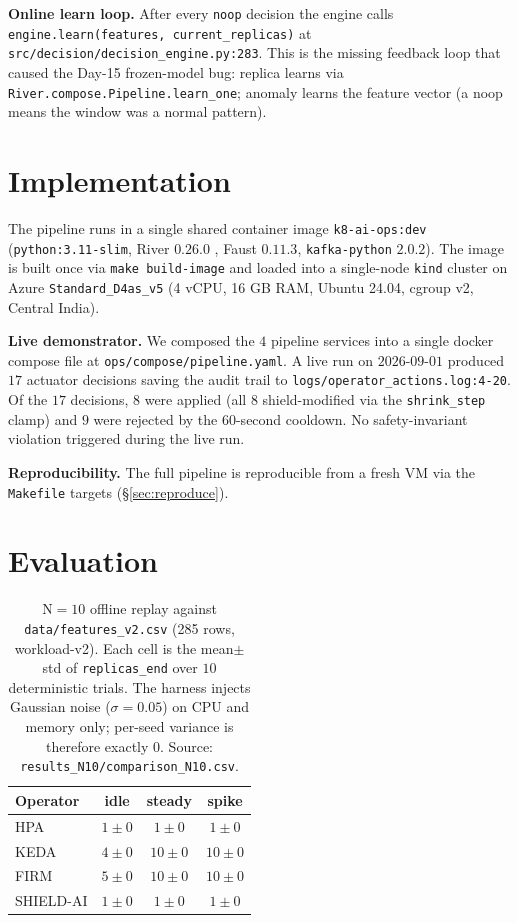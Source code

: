 \documentclass[conference,10pt]{IEEEtran}
\begin{document}
\textbf{Online learn loop.} After every \texttt{noop} decision the
engine calls \texttt{engine.learn(features, current\_replicas)} at
\texttt{src/decision/decision\_engine.py:283}. This is the missing
feedback loop that caused the Day-15 frozen-model bug:
replica learns via \texttt{River.compose.Pipeline.learn\_one};
anomaly learns the feature vector (a noop means the window was a
normal pattern).

\section{Implementation}
\label{sec:impl}

The pipeline runs in a single shared container image
\texttt{k8-ai-ops:dev} (\texttt{python:3.11-slim}, River $0.26.0$
\cite{river_jmlr_2020}, Faust $0.11.3$, \texttt{kafka-python} $2.0.2$).
The image is built once via \texttt{make build-image} and loaded into
a single-node \texttt{kind} cluster on Azure
\texttt{Standard\_D4as\_v5} (4 vCPU, 16 GB RAM, Ubuntu 24.04,
cgroup v2, Central India).

\textbf{Live demonstrator.} We composed the $4$ pipeline services
into a single docker compose file at \texttt{ops/compose/pipeline.yaml}.
A live run on $2026$-$09$-$01$ produced $17$ actuator decisions
saving the audit trail to \texttt{logs/operator\_actions.log:4-20}.
Of the $17$ decisions, $8$ were applied (all $8$ shield-modified via
the \texttt{shrink\_step} clamp) and $9$ were rejected by the
$60$-second cooldown. No safety-invariant violation triggered during
the live run.

\textbf{Reproducibility.} The full pipeline is reproducible from a
fresh VM via the \texttt{Makefile} targets (\S\ref{sec:reproduce}).

\section{Evaluation}
\label{sec:eval}

\begin{table}[!t]
  \centering
  \caption{N$=10$ offline replay against \texttt{data/features\_v2.csv} (285 rows, workload-v2). Each cell is the mean$\pm$std of \texttt{replicas\_end} over $10$ deterministic trials. The harness injects Gaussian noise ($\sigma=0.05$) on CPU and memory only; per-seed variance is therefore exactly $0$. Source: \texttt{results\_N10/comparison\_N10.csv}.}
  \label{tab:n10}
  \begin{tabular}{lccc}
    \toprule
    \textbf{Operator} & \textbf{idle} & \textbf{steady} & \textbf{spike} \\
    \midrule
    HPA       & $1 \pm 0$  & $1 \pm 0$  & $1 \pm 0$  \\
    KEDA      & $4 \pm 0$  & $10 \pm 0$ & $10 \pm 0$ \\
    FIRM      & $5 \pm 0$  & $10 \pm 0$ & $10 \pm 0$ \\
    SHIELD-AI & $1 \pm 0$  & $1 \pm 0$  & $1 \pm 0$  \\
    \bottomrule
  \end{tabular}
\end{table}
\end{document}

